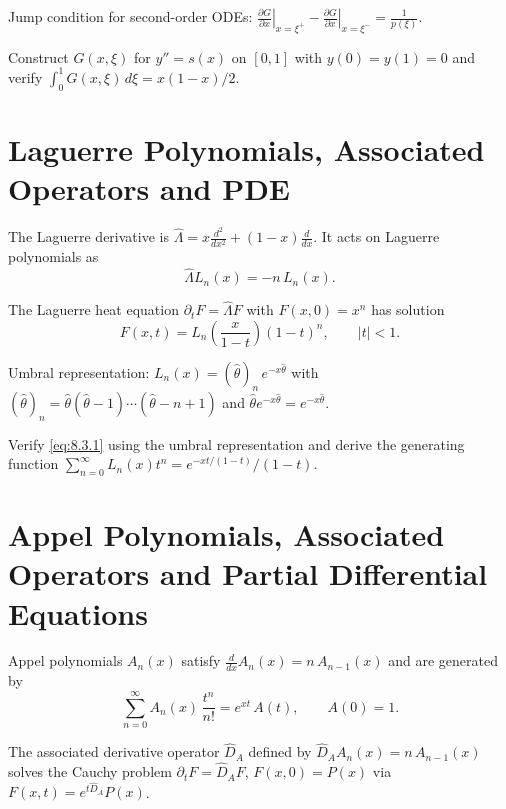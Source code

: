 Jump condition for second-order ODEs:
$\left.\frac{\partial G}{\partial x}\right|_{x=\xi^+}
-\left.\frac{\partial G}{\partial x}\right|_{x=\xi^-} = \frac{1}{p(\xi)}$.

\begin{exercise}
Construct $G(x,\xi)$ for $y''=s(x)$ on $[0,1]$ with $y(0)=y(1)=0$
and verify $\int_0^1 G(x,\xi)\,d\xi = x(1-x)/2$.
\end{exercise}

\section{Laguerre Polynomials, Associated Operators and PDE}

The Laguerre derivative is
$\hat\Lambda = x\frac{d^2}{dx^2}+(1-x)\frac{d}{dx}$.
It acts on Laguerre polynomials as
\begin{equation}
\hat\Lambda L_n(x) = -n\,L_n(x).
\label{eq:8.3.1}
\end{equation}

The Laguerre heat equation
$\partial_t F = \hat\Lambda F$ with $F(x,0)=x^n$
has solution
\begin{equation}
F(x,t) = L_n\!\left(\frac{x}{1-t}\right)(1-t)^n,
\qquad |t|<1.
\label{eq:8.3.2}
\end{equation}

Umbral representation:
$L_n(x)=(\hat\theta)_n\,e^{-x\hat\theta}$ with
$(\hat\theta)_n=\hat\theta(\hat\theta-1)\cdots(\hat\theta-n+1)$
and $\hat\theta e^{-x\hat\theta}=e^{-x\hat\theta}$.

\begin{exercise}
Verify \eqref{eq:8.3.1} using the umbral representation and derive the
generating function
$\sum_{n=0}^\infty L_n(x)t^n = e^{-xt/(1-t)}/(1-t)$.
\end{exercise}

\section{Appel Polynomials, Associated Operators and Partial Differential Equations}

Appel polynomials $A_n(x)$ satisfy
$\frac{d}{dx}A_n(x)=n\,A_{n-1}(x)$ and are generated by
\begin{equation}
\sum_{n=0}^{\infty} A_n(x)\,\frac{t^n}{n!}=e^{x t}\,A(t),
\qquad A(0)=1.
\label{eq:8.4.1}
\end{equation}

The associated derivative operator $\hat D_A$ defined by
$\hat D_A A_n(x)=n\,A_{n-1}(x)$ solves the Cauchy problem
$\partial_t F=\hat D_A F$, $F(x,0)=P(x)$ via
$F(x,t)=e^{t\hat D_A}P(x)$.

